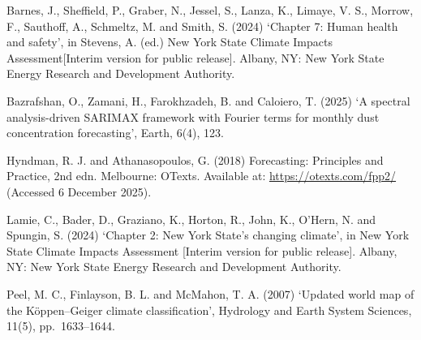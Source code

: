 \documentclass[
]{article}
\begin{document}
Barnes, J., Sheffield, P., Graber, N., Jessel, S., Lanza, K., Limaye, V.
S., Morrow, F., Sauthoff, A., Schmeltz, M. and Smith, S. (2024) `Chapter
7: Human health and safety', in Stevens, A. (ed.) New York State Climate
Impacts Assessment{[}Interim version for public release{]}. Albany, NY:
New York State Energy Research and Development Authority.

Bazrafshan, O., Zamani, H., Farokhzadeh, B. and Caloiero, T. (2025) `A
spectral analysis-driven SARIMAX framework with Fourier terms for
monthly dust concentration forecasting', Earth, 6(4), 123.

Hyndman, R. J. and Athanasopoulos, G. (2018) Forecasting: Principles and
Practice, 2nd edn. Melbourne: OTexts. Available at:
\url{https://otexts.com/fpp2/} (Accessed 6 December 2025).

Lamie, C., Bader, D., Graziano, K., Horton, R., John, K., O'Hern, N. and
Spungin, S. (2024) `Chapter 2: New York State's changing climate', in
New York State Climate Impacts Assessment {[}Interim version for public
release{]}. Albany, NY: New York State Energy Research and Development
Authority.

Peel, M. C., Finlayson, B. L. and McMahon, T. A. (2007) `Updated world
map of the Köppen--Geiger climate classification', Hydrology and Earth
System Sciences, 11(5), pp.~1633--1644.
\end{document}
